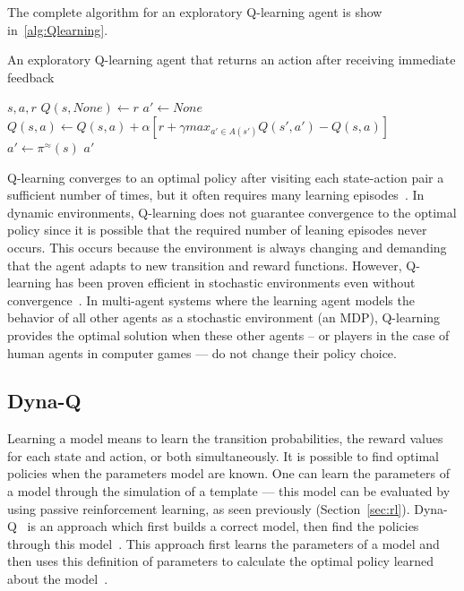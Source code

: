 The complete algorithm for an exploratory Q-learning agent is show in~\ref{alg:Qlearning}.

\begin{algorithm}
	\caption{An exploratory Q-learning agent that returns an action after receiving immediate feedback}
	\label{alg:Qlearning}
	\begin{algorithmic}[1]
		\REQUIRE $s, a, r$
			\STATE $Q(s,None) \gets r$
			\STATE $a' \gets None$
		\ELSE
			\STATE $Q(s,a) \gets Q(s,a) + \alpha[r + \gamma max_{a' \in A(s')}Q(s',a') - Q(s,a)]$
			\STATE $a' \gets \pi^{\approx}(s)$
		\ENDIF
		\RETURN $a'$
	\end{algorithmic}
\end{algorithm}

Q-learning converges to an optimal policy after visiting each state-action pair a sufficient number of times, but it often requires many learning episodes~\cite{watkins1992technical}.
In dynamic environments, Q-learning does not guarantee convergence to the optimal policy since it is possible that the required number of leaning episodes never occurs.
This occurs because the environment is always changing and demanding that the agent adapts to new transition and reward functions.
However, Q-learning has been proven efficient in stochastic environments 
even without convergence~\cite{sandholm1996multiagent,tesauro2002pricing,amato2010highlevel}.
In multi-agent systems where the learning agent models the behavior of all other agents as a stochastic environment (an MDP), Q-learning provides the optimal solution when these other agents
-- or players in the case of human agents in computer games --- do not change their policy choice. 



\subsection{Dyna-Q}
\label{subsec:dynaq}

Learning a model means to learn the transition probabilities, the reward values for each state and action, or both simultaneously.
It is possible to find optimal policies when the parameters model are known.
One can learn the parameters of a model through the simulation of a template --- this model can be evaluated by using passive reinforcement learning, as seen previously (Section~\ref{sec:rl}).
Dyna-Q~\cite{sutton1991dyna} is an approach which first builds a correct model, then find the policies through this model~\cite{kaelbling1996reinforcement}.
This approach first learns the parameters of a model and then uses this definition of parameters to calculate the optimal policy learned about the model~\cite{amato2010highlevel}.

